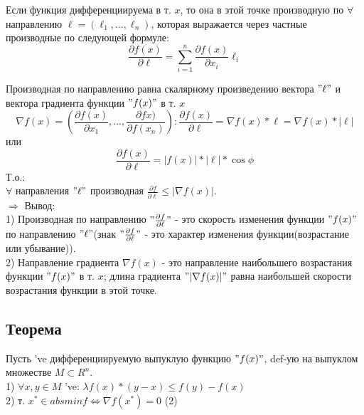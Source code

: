 \documentclass[a4paper]{article}
\begin{document}
Если функция дифференциируема в т. $x$, то она в этой точке производную по $\forall$ направлению $\ell = (\ell_1, ... , \ell_n)$, которая выражается через частные производные по следующей формуле: 
$$
\frac{\partial f(x)}{\partial \ell} = \sum_{i = 1}^{n} \frac{\partial f(x)}{\partial x_i} \ell_i
$$

\newpage

Производная по направлению равна скалярному произведению вектора $"\ell"$ и вектора градиента функции $"f(x)"$ в т. $x$ \\
$$\nabla f(x) = \left(\frac{\partial f(x)}{\partial x_1} , ... , \frac{\partial fx)}{\partial f(x_n)}\right): \frac{\partial f(x)}{\partial \ell} = \nabla f(x) * \ell = \nabla f(x) * |\ell|$$
или \\
$$\frac{\partial f(x)}{\partial \ell} = |f(x)| * |\ell| * \cos{\phi}$$
Т.о.: \\
$\forall$ направления $"\ell"$ производная $\frac{\partial f}{\partial \ell} \leqslant |\nabla f(x)|$. \\
$\Rightarrow$ Вывод: \\
1) Производная по направлению $"\frac{\partial f}{\partial \ell}"$ - это скорость изменения функции $"f(x)"$ по направлению $"\ell"$(знак $"\frac{\partial f}{\partial \ell}"$ - это характер изменения функции(возрастание или убывание)). \\
2) Направление градиента $\nabla f(x)$ - это направление наибольшего возрастания функции $"f(x)"$ в т. $x$; длина градиента $"|\nabla f(x)|"$ равна наибольшей скорости возрастания функции в этой точке. \\
\subsection*{Теорема} 
Пусть 've дифференциируемую выпуклую функцию $"f(x)"$, def-ую на выпуклом множестве $M \subset R^n$. \\
1) $\forall x, y \in M$ 've: $\lambda f(x) * (y-x) \leqslant f(y) - f(x)$ \\
2) т. $x^* \in absminf \Leftrightarrow \nabla f(x^*) = 0$ (2) \\
\end{document}

